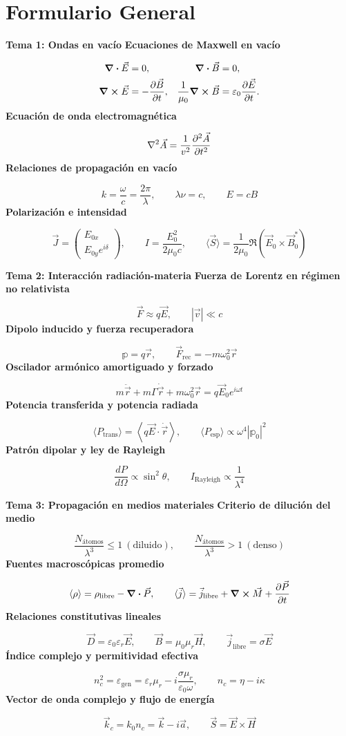 \documentclass[12pt, a4paper]{article}
\theoremstyle{plain}
\theoremstyle{definition}
\theoremstyle{remark}
\newcommand{\ve}[1]{\vec{#1}}
\newcommand{\formulaname}[1]{\textbf{#1}\par\vspace{2pt}}
\begin{document}
\section{Formulario General}

\begin{mdframed}[style=resultado]
\textbf{Tema 1: Ondas en vacío}
\formulaname{Ecuaciones de Maxwell en vacío}
\[
\begin{aligned}
\div\ve{E} &= 0, &
\div\ve{B} &= 0, \\
\curl\ve{E} &= -\pdv{\ve{B}}{t}, &
\frac{1}{\mu_0}\curl\ve{B} &= \varepsilon_0\pdv{\ve{E}}{t}.
\end{aligned}
\]
\formulaname{Ecuación de onda electromagnética}
\[
\nabla^2\ve{A}=\frac{1}{v^2}\pdv[2]{\ve{A}}{t}
\]
\formulaname{Relaciones de propagación en vacío}
\[
k=\frac{\omega}{c}=\frac{2\pi}{\lambda},
\qquad
\lambda\nu=c,
\qquad
E=cB
\]
\formulaname{Polarización e intensidad}
\[
\ve{J}=
\begin{pmatrix}
E_{0x}\\E_{0y}e^{i\delta}
\end{pmatrix},
\qquad
I=\frac{E_0^2}{2\mu_0 c},
\qquad
\langle\ve{S}\rangle=\frac{1}{2\mu_0}\Re(\ve{E}_0\times\ve{B}_0^*)
\]
\end{mdframed}

\begin{mdframed}[style=resultado]
\textbf{Tema 2: Interacción radiación-materia}
\formulaname{Fuerza de Lorentz en régimen no relativista}
\[
\ve{F}\approx q\ve{E},
\qquad
|\ve{v}|\ll c
\]
\formulaname{Dipolo inducido y fuerza recuperadora}
\[
\mathbb{p}=q\ve{r},
\qquad
\ve{F}_{\text{rec}}=-m\omega_0^2\ve{r}
\]
\formulaname{Oscilador armónico amortiguado y forzado}
\[
m\ddot{\ve{r}}+m\Gamma\dot{\ve{r}}+m\omega_0^2\ve{r}
=q\ve{E}_0e^{i\omega t}
\]
\formulaname{Potencia transferida y potencia radiada}
\[
\langle P_{\text{trans}}\rangle=\left\langle q\ve{E}\cdot\dot{\ve{r}}\right\rangle,
\qquad
\langle P_{\text{esp}}\rangle\propto\omega^4|\mathbb{p}_0|^2
\]
\formulaname{Patrón dipolar y ley de Rayleigh}
\[
\frac{dP}{d\Omega}\propto\sin^2\theta,
\qquad
I_{\text{Rayleigh}}\propto\frac{1}{\lambda^4}
\]
\end{mdframed}

\begin{mdframed}[style=resultado]
\textbf{Tema 3: Propagación en medios materiales}
\formulaname{Criterio de dilución del medio}
\[
\frac{N_{\text{átomos}}}{\lambda^3}\le 1\ (\text{diluido}),
\qquad
\frac{N_{\text{átomos}}}{\lambda^3}>1\ (\text{denso})
\]
\formulaname{Fuentes macroscópicas promedio}
\[
\langle\rho\rangle=\rho_{\text{libre}}-\div\ve{P},
\qquad
\langle\ve{j}\rangle=\ve{j}_{\text{libre}}+\curl\ve{M}+\pdv{\ve{P}}{t}
\]
\formulaname{Relaciones constitutivas lineales}
\[
\ve{D}=\varepsilon_0\varepsilon_r\ve{E},
\qquad
\ve{B}=\mu_0\mu_r\ve{H},
\qquad
\ve{j}_{\text{libre}}=\sigma\ve{E}
\]
\formulaname{Índice complejo y permitividad efectiva}
\[
n_c^2=\varepsilon_{\text{gen}}
=\varepsilon_r\mu_r-i\frac{\sigma\mu_r}{\varepsilon_0\omega},
\qquad
n_c=\eta-i\kappa
\]
\formulaname{Vector de onda complejo y flujo de energía}
\[
\ve{k}_c=k_0n_c=\ve{k}-i\ve{a},
\qquad
\ve{S}=\ve{E}\times\ve{H}
\]
\end{mdframed}
\end{document}
